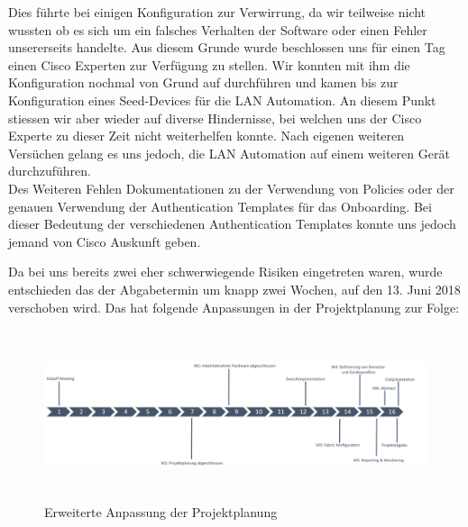Dies führte bei einigen Konfiguration zur Verwirrung, da wir teilweise nicht wussten ob es sich um ein falsches Verhalten der Software oder einen Fehler unsererseits handelte. Aus diesem Grunde wurde beschlossen uns für einen Tag einen Cisco Experten zur Verfügung zu stellen. Wir konnten mit ihm die Konfiguration nochmal von Grund auf durchführen und kamen bis zur Konfiguration eines Seed-Devices für die LAN Automation. An diesem Punkt stiessen wir aber wieder auf diverse Hindernisse, bei welchen uns der Cisco Experte zu dieser Zeit nicht weiterhelfen konnte. Nach eigenen weiteren Versüchen gelang es uns jedoch, die LAN Automation auf einem weiteren Gerät durchzuführen.\\
Des Weiteren Fehlen Dokumentationen zu der Verwendung von Policies oder der genauen Verwendung der Authentication Templates für das Onboarding. Bei dieser Bedeutung der verschiedenen Authentication Templates konnte uns jedoch jemand von Cisco Auskunft geben. 

Da bei uns bereits zwei eher schwerwiegende Risiken eingetreten waren, wurde entschieden das der Abgabetermin um knapp zwei Wochen, auf den 13. Juni 2018 verschoben wird. Das hat folgende Anpassungen in der Projektplanung zur Folge:


\begin{figure}[H]
	\centering
	\includegraphics[height=5cm]{img/ZeitlichePlanung_v4.png}
	\caption{Erweiterte Anpassung der Projektplanung}
	\label{fig:Erweiterte Anpassungen der Projektplanung}
\end{figure} 

